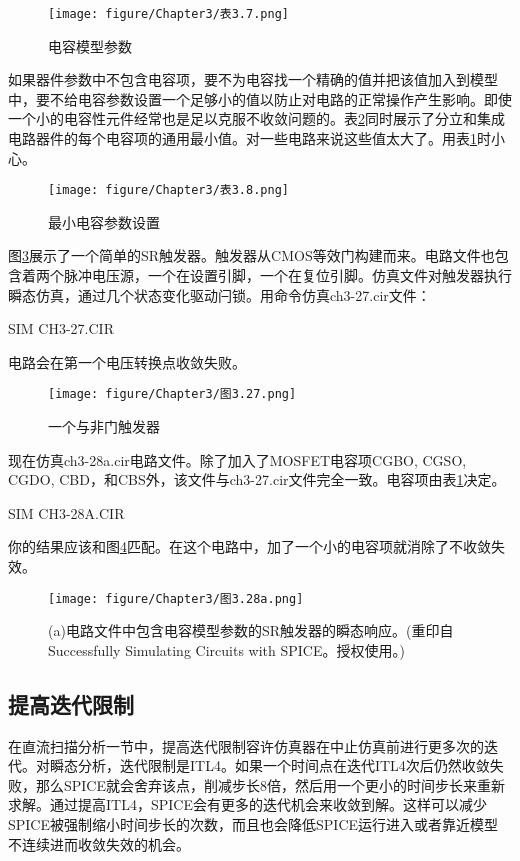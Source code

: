 \begin{figure}[htbp]
\small
    \centering
    \texttt{[image: figure/Chapter3/表3.7.png]}
    \caption{电容模型参数}
    \label{表3.7}
\end{figure}

如果器件参数中不包含电容项，要不为电容找一个精确的值并把该值加入到模型中，要不给电容参数设置一个足够小的值以防止对电路的正常操作产生影响。即使一个小的电容性元件经常也是足以克服不收敛问题的。表\ref{表3.8}同时展示了分立和集成电路器件的每个电容项的通用最小值。对一些电路来说这些值太大了。用表\ref{表3.7}时小心。

\begin{figure}[htbp]
\small
    \centering
    \texttt{[image: figure/Chapter3/表3.8.png]}
    \caption{最小电容参数设置}
    \label{表3.8}
\end{figure}

图\ref{图3.27}展示了一个简单的SR触发器。触发器从CMOS等效门构建而来。电路文件也包含着两个脉冲电压源，一个在设置引脚，一个在复位引脚。仿真文件对触发器执行瞬态仿真，通过几个状态变化驱动闩锁。用命令仿真ch3-27.cir文件：

SIM CH3-27.CIR

电路会在第一个电压转换点收敛失败。


\begin{figure}[htbp]
\small
    \centering
    \texttt{[image: figure/Chapter3/图3.27.png]}
    \caption{一个与非门触发器}
    \label{图3.27}
\end{figure}

现在仿真ch3-28a.cir电路文件。除了加入了MOSFET电容项CGBO, CGSO, CGDO, CBD，和CBS外，该文件与ch3-27.cir文件完全一致。电容项由表\ref{表3.7}决定。

SIM CH3-28A.CIR

你的结果应该和图\ref{图3.28a}匹配。在这个电路中，加了一个小的电容项就消除了不收敛失效。

\begin{figure}[htbp]
\small
    \centering
    \texttt{[image: figure/Chapter3/图3.28a.png]}
    \caption{(a)电路文件中包含电容模型参数的SR触发器的瞬态响应。(重印自Successfully Simulating Circuits with SPICE。授权使用。)}
    \label{图3.28a}
\end{figure}

\subsection{提高迭代限制}
在直流扫描分析一节中，提高迭代限制容许仿真器在中止仿真前进行更多次的迭代。对瞬态分析，迭代限制是ITL4。如果一个时间点在迭代ITL4次后仍然收敛失败，那么SPICE就会舍弃该点，削减步长8倍，然后用一个更小的时间步长来重新求解。通过提高ITL4，SPICE会有更多的迭代机会来收敛到解。这样可以减少SPICE被强制缩小时间步长的次数，而且也会降低SPICE运行进入或者靠近模型不连续进而收敛失效的机会。

